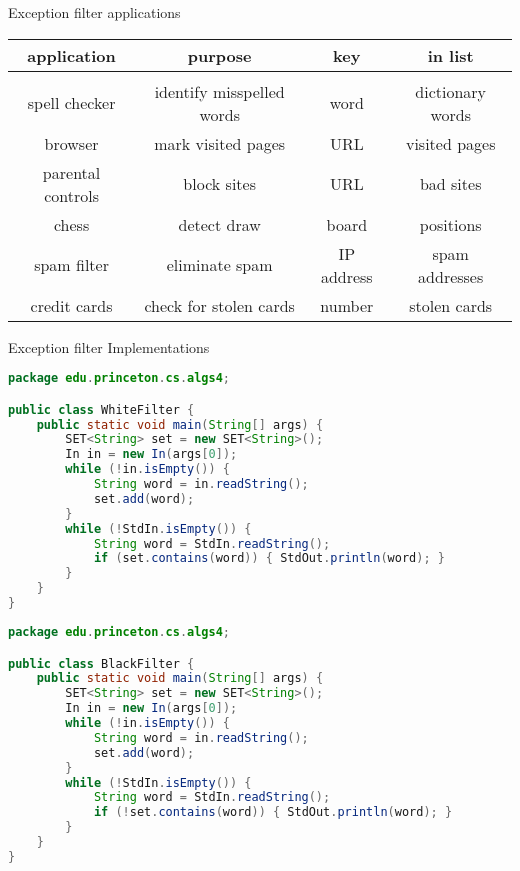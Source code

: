 \documentclass[8pt,a4paper,compress]{beamer}
\begin{document}
\begin{frame}[fragile]
\pause

Exception filter applications
\begin{center}
\begin{tabular}{cccc}
application & purpose & key & in list \\ \hline \\
spell checker & identify misspelled words & word & dictionary words \\
browser & mark visited pages & URL & visited pages \\
parental controls & block sites & URL & bad sites \\
chess & detect draw & board & positions \\
spam filter & eliminate spam  & IP address & spam addresses \\
credit cards & check for stolen cards & number & stolen cards
\end{tabular} 
\end{center}
\end{frame}

\begin{frame}[fragile]
\pause

Exception filter Implementations
\begin{lstlisting}[language=Java]
package edu.princeton.cs.algs4;

public class WhiteFilter {  
    public static void main(String[] args) {
        SET<String> set = new SET<String>();
        In in = new In(args[0]);
        while (!in.isEmpty()) {
            String word = in.readString();
            set.add(word);
        }
        while (!StdIn.isEmpty()) {
            String word = StdIn.readString();
            if (set.contains(word)) { StdOut.println(word); }
        }
    }
}
\end{lstlisting}

\pause

\begin{lstlisting}[language=Java]
package edu.princeton.cs.algs4;

public class BlackFilter {  
    public static void main(String[] args) {
        SET<String> set = new SET<String>();
        In in = new In(args[0]);
        while (!in.isEmpty()) {
            String word = in.readString();
            set.add(word);
        }
        while (!StdIn.isEmpty()) {
            String word = StdIn.readString();
            if (!set.contains(word)) { StdOut.println(word); }
        }
    }
}
\end{lstlisting}
\end{frame}
\end{document}
